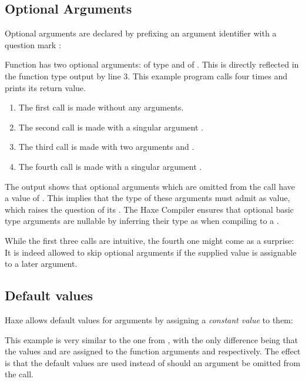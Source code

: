 \subsection{Optional Arguments}
\label{types-function-optional-arguments}

Optional arguments are declared by prefixing an argument identifier with a question mark :

Function  has two optional arguments:  of type  and  of . This is directly reflected in the function type output by line 3. 
This example program calls  four times and prints its return value.

\begin{enumerate}
	\item The first call is made without any arguments.
	\item The second call is made with a singular argument .
	\item The third call is made with two arguments  and .
	\item The fourth call is made with a singular argument .
\end{enumerate}
The output shows that optional arguments which are omitted from the call have a value of . This implies that the type of these arguments must admit  as value, which raises the question of its . The Haxe Compiler ensures that optional basic type arguments are nullable by inferring their type as  when compiling to a .

While the first three calls are intuitive, the fourth one might come as a surprise: It is indeed allowed to skip optional arguments if the supplied value is assignable to a later argument.


\subsection{Default values}
\label{types-function-default-values}

Haxe allows default values for arguments by assigning a \emph{constant value} to them:

This example is very similar to the one from , with the only difference being that the values  and  are assigned to the function arguments  and  respectively. The effect is that the default values are used instead of  should an argument be omitted from the call.


